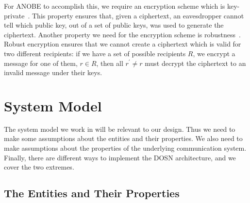 For \ac{ANOBE} to accomplish this, we require an encryption scheme which is 
key-private~\cite{KeyPrivacy}.
This property ensures that, given a ciphertext, an eavesdropper cannot tell 
which public key, out of a set of public keys, was used to generate the 
ciphertext.
Another property we need for the encryption scheme is 
robustness~\cite{RobustEncryption}.
Robust encryption ensures that we cannot create a ciphertext which is valid for 
two different recipients:
if we have a set of possible recipients \(R\), we encrypt a message for one of 
them, \(r\in R\), then all \(r^\prime\neq r\) must decrypt the ciphertext to an 
invalid message under their keys.


\section{System Model}\label{sec:SystemModel}
The system model we work in will be relevant to our design.
Thus we need to make some assumptions about the entities and their 
properties.
We also need to make assumptions about the properties of the underlying 
communication system.
Finally, there are different ways to implement the \ac{DOSN} architecture, and 
we cover the two extremes.

\subsection{The Entities and Their Properties}

